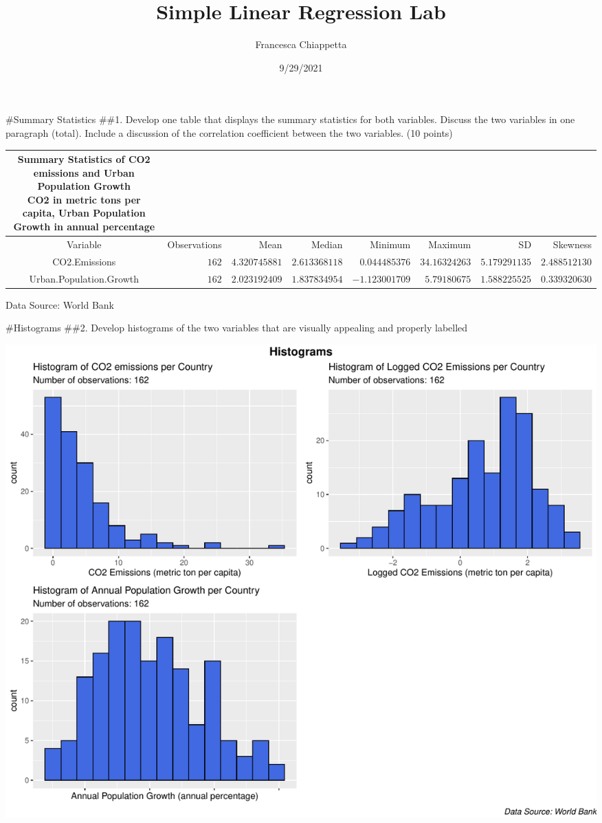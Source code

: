 \documentclass[
]{article}
\title{Simple Linear Regression Lab}
\author{Francesca Chiappetta}
\date{9/29/2021}
\begin{document}
\maketitle

\#Summary Statistics \#\#1. Develop one table that displays the summary
statistics for both variables. Discuss the two variables in one
paragraph (total). Include a discussion of the correlation coefficient
between the two variables. (10 points)

\captionsetup[table]{labelformat=empty,skip=1pt}
\begin{longtable}{crrrrrrr}
\caption*{
{\large Summary Statistics of CO2 emissions and Urban Population Growth} \\ 
{\small CO2 in metric tons per capita, Urban Population Growth in annual percentage}
} \\ 
\toprule
Variable & Observations & Mean & Median & Minimum & Maximum & SD & Skewness \\ 
\midrule
CO2.Emissions & $162$ & $4.320745881$ & $2.613368118$ & $0.044485376$ & $34.16324263$ & $5.179291135$ & $2.488512130$ \\ 
Urban.Population.Growth & $162$ & $2.023192409$ & $1.837834954$ & $-1.123001709$ & $5.79180675$ & $1.588225525$ & $0.339320630$ \\ 
 \bottomrule
\end{longtable}
\begin{minipage}{\linewidth}
Data Source: World Bank\\ 
\end{minipage}

\#Histograms \#\#2. Develop histograms of the two variables that are
visually appealing and properly labelled

\includegraphics{LinearLab_files/figure-latex/unnamed-chunk-1-1.pdf}
\end{document}

